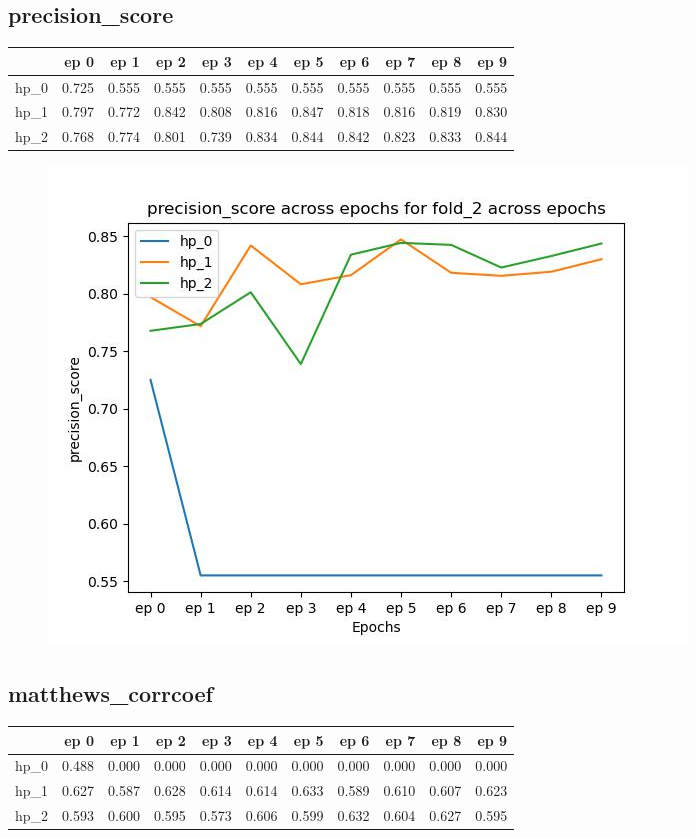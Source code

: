 \documentclass{article}
\begin{document}
\subsection{precision\_score}
\begin{tabular}{lrrrrrrrrrr}
\toprule
{} &   ep 0 &   ep 1 &   ep 2 &   ep 3 &   ep 4 &   ep 5 &   ep 6 &   ep 7 &   ep 8 &   ep 9 \\
\midrule
hp\_0 &  0.725 &  0.555 &  0.555 &  0.555 &  0.555 &  0.555 &  0.555 &  0.555 &  0.555 &  0.555 \\
hp\_1 &  0.797 &  0.772 &  0.842 &  0.808 &  0.816 &  0.847 &  0.818 &  0.816 &  0.819 &  0.830 \\
hp\_2 &  0.768 &  0.774 &  0.801 &  0.739 &  0.834 &  0.844 &  0.842 &  0.823 &  0.833 &  0.844 \\
\bottomrule
\end{tabular}

\begin{figure}[H]
\includegraphics[scale = 0.75]{fold_2/precision_score}
\end{figure}
\subsection{matthews\_corrcoef}
\begin{tabular}{lrrrrrrrrrr}
\toprule
{} &   ep 0 &   ep 1 &   ep 2 &   ep 3 &   ep 4 &   ep 5 &   ep 6 &   ep 7 &   ep 8 &   ep 9 \\
\midrule
hp\_0 &  0.488 &  0.000 &  0.000 &  0.000 &  0.000 &  0.000 &  0.000 &  0.000 &  0.000 &  0.000 \\
hp\_1 &  0.627 &  0.587 &  0.628 &  0.614 &  0.614 &  0.633 &  0.589 &  0.610 &  0.607 &  0.623 \\
hp\_2 &  0.593 &  0.600 &  0.595 &  0.573 &  0.606 &  0.599 &  0.632 &  0.604 &  0.627 &  0.595 \\
\bottomrule
\end{tabular}
\end{document}

